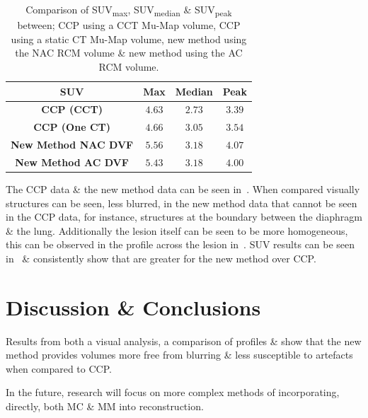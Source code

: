     \begin{table}
        \vspace{-0.5cm}
        \centering
        \captionsetup{singlelinecheck=false, justification=centering}
        \caption{Comparison of \gls{SUV}\textsubscript{max}, \gls{SUV}\textsubscript{median} \& \gls{SUV}\textsubscript{peak} between; \gls{CCP} using a \gls{CCT} \gls{Mu-Map} volume, \gls{CCP} using a static \gls{CT} \gls{Mu-Map} volume, new method using the \gls{NAC} \gls{RCM} volume \& new method using the \gls{AC} \gls{RCM} volume.}
        
        \resizebox*{0.75\linewidth}{!}
        {
            \begin{tabular}{||c|ccc||}
                \hline
                \textbf{\gls{SUV}} & \textbf{Max} & \textbf{Median} & \textbf{Peak} \\
                \hline
                \textbf{\gls{CCP} (\gls{CCT})}          & $4.63$ & $2.73$ & $3.39$ \\
                \textbf{\gls{CCP} (One \gls{CT})}       & $4.66$ & $3.05$ & $3.54$ \\
                \hline
                \textbf{New Method \gls{NAC} \gls{DVF}} & $5.56$ & $3.18$ & $4.07$ \\
                \textbf{New Method \gls{AC} \gls{DVF}}  & $5.43$ & $3.18$ & $4.00$ \\
                \hline
            \end{tabular}
        }
        \label{tab:suv}
        \vspace{-0.5cm}
    \end{table}
    
     The \gls{CCP} data \& the new method data can be seen in~. When compared visually structures can be seen, less blurred, in the new method data that cannot be seen in the \gls{CCP} data, for instance, structures at the boundary between the diaphragm \& the lung. Additionally the lesion itself can be seen to be more homogeneous, this can be observed in the profile across the lesion in~. \gls{SUV} results can be seen in~ \& consistently show that  are greater for the new method over \gls{CCP}.

\vspace{-0.5cm}

\section{Discussion \& Conclusions} \label{sec:discussion_and_conclusions}
    Results from both a visual analysis, a comparison of profiles \&  show that the new method provides volumes more free from blurring \& less susceptible to artefacts when compared to \gls{CCP}.
    
    In the future, research will focus on more complex methods of incorporating, directly, both \gls{MC}  \& \gls{MM} into reconstruction.
    